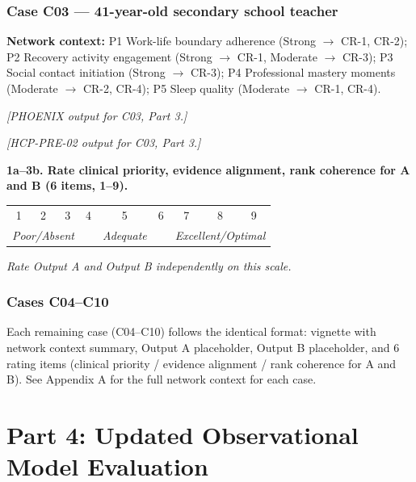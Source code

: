 \documentclass[11pt,a4paper]{article}
\makeatletter
\newcommand{\likertscale}[1]{%
\par\vspace{0.15em}%
\noindent\begin{tcolorbox}[colback=ScaleBG,colframe=BorderGrey,boxrule=0.4pt,arc=1mm,left=5pt,right=5pt,top=4pt,bottom=4pt]%
\small\textbf{\color{SlateMid}#1}\\[0.25em]%
\begin{tabular}{@{}*{9}{c}@{}}%
1 & 2 & 3 & 4 & 5 & 6 & 7 & 8 & 9 \\%
\multicolumn{3}{l}{\tiny\itshape Poor/Absent} & & \multicolumn{1}{c}{\tiny\itshape Adequate} & & \multicolumn{3}{r}{\tiny\itshape Excellent/Optimal}%
\end{tabular}%
\quad\textit{Rate Output A and Output B independently on this scale.}%
\end{tcolorbox}\vspace{0.1em}}
\makeatother
\begin{document}
\subsubsection*{Case C03 --- 41-year-old secondary school teacher}
\begin{vignettebox}
\small\textbf{Network context:} P1 Work-life boundary adherence (Strong $\to$ CR-1, CR-2); P2 Recovery activity engagement (Strong $\to$ CR-1, Moderate $\to$ CR-3); P3 Social contact initiation (Strong $\to$ CR-3); P4 Professional mastery moments (Moderate $\to$ CR-2, CR-4); P5 Sleep quality (Moderate $\to$ CR-1, CR-4).
\end{vignettebox}
\begin{outputAbox}\small\textit{[PHOENIX output for C03, Part 3.]}\end{outputAbox}
\begin{outputBbox}\small\textit{[HCP-PRE-02 output for C03, Part 3.]}\end{outputBbox}
\begin{ratingbox}
\likertscale{1a--3b. Rate \textbf{clinical priority, evidence alignment, rank coherence} for A and B (6 items, 1--9).}
\end{ratingbox}

\vspace{0.4em}

\subsubsection*{Cases C04--C10}
\begin{instrbox}
\small Each remaining case (C04--C10) follows the identical format: vignette with network context summary, Output A placeholder, Output B placeholder, and 6 rating items (clinical priority / evidence alignment / rank coherence for A and B). See Appendix A for the full network context for each case.
\end{instrbox}

\newpage

\section{Part 4: Updated Observational Model Evaluation}
\label{sec:part4}
\end{document}

